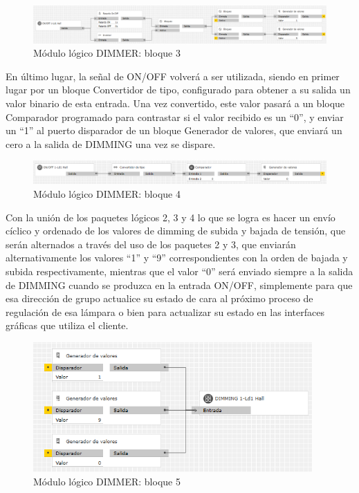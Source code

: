  \begin{center}
\begin{figure}[H]
\includegraphics[width=1.15\textwidth]{figures/log_dimm_b3.png}   
\caption{Módulo lógico DIMMER: bloque 3}
\label{fig:log_dimm_b3}
\end{figure}
\end{center}
En último lugar, la señal de ON/OFF volverá a ser utilizada, siendo en primer lugar por un bloque Convertidor de tipo, configurado para obtener a su salida un valor binario de esta entrada. Una vez convertido, este valor pasará a un bloque Comparador programado para  contrastar si el valor recibido es un “0”, y enviar un “1” al puerto disparador de un bloque Generador de valores, que enviará un cero a la salida de DIMMING una vez se dispare. 
 \begin{center}
\begin{figure}[H]
\includegraphics[width=1.15\textwidth]{figures/log_dimm_b4.png}   
\caption{Módulo lógico DIMMER: bloque 4}
\label{fig:log_dimm_b4}
\end{figure}
\end{center}
Con la unión de los paquetes lógicos 2, 3 y 4 lo que se logra es hacer un envío cíclico y ordenado de los valores de dimming de subida y bajada de tensión, que serán alternados a través del uso de los paquetes 2 y 3, que enviarán alternativamente los valores “1” y “9” correspondientes con la orden de bajada y subida respectivamente, mientras que el valor “0” será enviado siempre a la salida de DIMMING cuando se produzca en la entrada ON/OFF, simplemente para que esa dirección de grupo actualice su estado de cara al próximo proceso de regulación de esa lámpara o bien para actualizar su estado en las interfaces gráficas que utiliza el cliente.
 \begin{center}
\begin{figure}[H]
\includegraphics[width=0.95\textwidth]{figures/log_dimm_b5.png}   
\caption{Módulo lógico DIMMER: bloque 5}
\label{fig:log_dimm_b5}
\end{figure}
\end{center}
